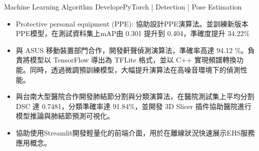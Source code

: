 \begin{cventries}
{\begin{cvitems}
\begin{itemize}
        \end{itemize}
        \item{Machine Learning Algorithm Develope}{}{PyTorch | Detection | Pose Estimation}
        \begin{itemize}
            \item Protective personal equipment (PPE): 協助設計PPE演算法。並訓練新版本PPE模型，在測試資料集上mAP由 0.301 提升到 0.404，準確度提升 34.22\%
        \end{itemize}
        \begin{itemize}
            \item 與 ASUS 移動裝置部門合作，開發鼾聲偵測演算法，準確率高達 94.12 \%。負責將模型以 TensorFlow 導出為 TFLite 格式，並以 C++ 實現頻譜轉換功能。同時，透過微調預訓練模型，大幅提升演算法在高噪音環境下的偵測性能。
        \end{itemize}
        \begin{itemize}
            \item 與台南大型醫院合作開發肺結節分割與分類演算法，在醫院測試集上平均分割 DSC 達 0.7481，分類準確率達 91.84\%，並開發 3D Slicer 插件協助醫院進行模型推論與肺結節預測可視化。
        \end{itemize}
        \begin{itemize}
            \item 協助使用Streamlit開發輕量化的前端介面，用於在離線狀況快速展示EHS服務應用概念。
        \end{itemize}
      \end{cvitems}
    }


\end{cventries}
